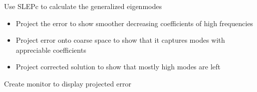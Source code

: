 \begin{refsection}
Use SLEPc to calculate the generalized eigenmodes
\begin{itemize}
  \item Project the error to show smoother decreasing coefficients of high frequencies
  \item Project error onto coarse space to show that it captures modes with appreciable coefficients
  \item Project corrected solution to show that mostly high modes are left
\end{itemize}

Create monitor to display projected error

\printbibliography[heading=subbibliography] %
\end{refsection}
